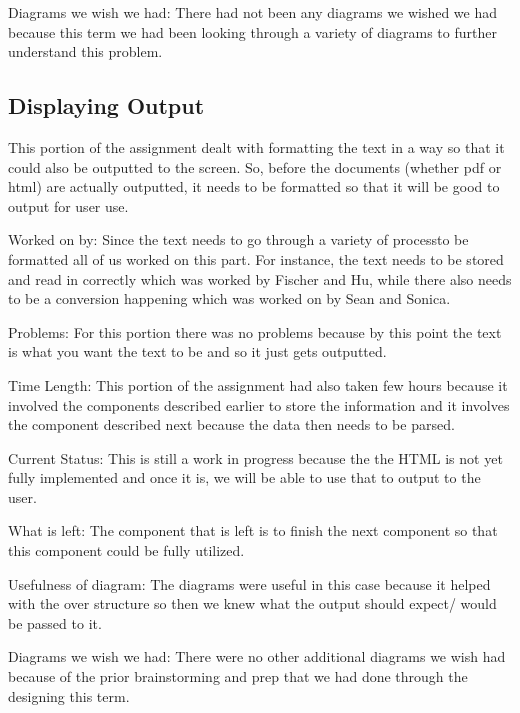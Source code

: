 \noindent Diagrams we wish we had: There had not been any diagrams we wished we had because this term we had been looking through a variety of diagrams to further understand this problem. \

\subsection{Displaying Output}
This portion of the assignment dealt with formatting the text in a way so that it could also be outputted to the screen. So, before the documents (whether pdf or html) are actually outputted, it needs to be formatted so that it will be good to output for user use. \newline

\noindent Worked on by: Since the text needs to go through a variety of processto be formatted all of us worked on this part. For instance, the text needs to be stored and read in correctly which was worked by Fischer and Hu, while there also needs to be a conversion happening which was worked on by Sean and Sonica. \newline

\noindent Problems: For this portion there was no problems because by this point the text is what you want the text to be and so it just gets outputted. \newline

\noindent Time Length: This portion of the assignment had also taken few hours because it involved the components described earlier to store the information and it involves the component described next because the data then needs to be parsed. \newline

\noindent Current Status: This is still a work in progress because the the HTML is not yet fully implemented and once it is, we will be able to use that to output to the user. \newline

\noindent What is left: The component that is left is to finish the next component so that this component could be fully utilized. \newline

\noindent Usefulness of diagram: The diagrams were useful in this case because it helped with the over structure so then we knew what the output should expect/ would be passed to it. \newline

\noindent Diagrams we wish we had: There were no other additional diagrams we wish had because of the prior brainstorming and prep that we had done through the designing this term. 
 
